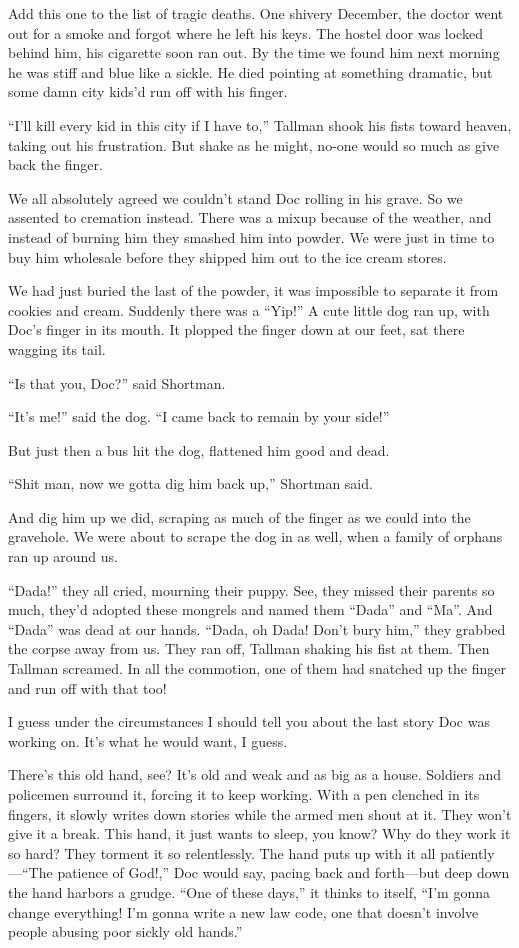\documentclass[oneside]{book}
\begin{document}
Add this one to the list of tragic deaths.
One shivery December, the doctor went out for a smoke and
forgot where he left his keys.  The hostel door was locked
behind him, his cigarette soon ran out.  By the time we
found him next morning he was stiff and blue like a sickle.
He died pointing at something dramatic, but some
damn city kids'd run off with his finger.

``I'll kill every kid in this city if I have to,''
Tallman shook his fists toward heaven, taking out his
frustration.  But shake as he might, no-one would so
much as give back the finger.

We all absolutely agreed we couldn't stand
Doc rolling in his grave.  So we assented to cremation
instead.  There was a mixup because of the weather, and
instead of burning him they smashed him into powder.
We were just in time to buy him wholesale
before they shipped him out to the ice cream stores.

We had just buried the last of the powder, it was impossible
to separate it from cookies and cream.  Suddenly there was
a ``Yip!''  A cute little dog ran up, with Doc's finger in
its mouth.  It plopped the finger down at our feet, sat there
wagging its tail.

``Is that you, Doc?'' said Shortman.

``It's me!'' said the dog.  ``I came back to remain by your side!''

But just then a bus hit the dog, flattened him good and dead.

``Shit man, now we gotta dig him back up,''
Shortman said.

And dig him up we did, scraping as much of the
finger as we could into the gravehole.  We were about to scrape
the dog in as well, when a family of orphans ran up around us.

``Dada!'' they all cried, mourning their puppy.  See, they missed their
parents so much, they'd adopted these mongrels and named them
``Dada'' and ``Ma''.  And ``Dada'' was dead at our hands.
``Dada, oh Dada!  Don't bury him,'' they grabbed the corpse away from
us.  They ran off, Tallman shaking his fist at them.  Then
Tallman screamed.  In all the commotion, one of them had
snatched up the finger and run off with that too!

I guess under the circumstances I should tell you about the last
story Doc was working on.  It's what he would want, I guess.

There's this old hand, see?  It's old and weak and as big as a house.
Soldiers and policemen surround it, forcing it to keep working.
With a pen clenched in its fingers, it slowly writes down stories
while the armed men shout at it.  They won't give it a break.
This hand, it just wants to sleep, you know?  Why do they work it so
hard?  They torment it so relentlessly.  The hand puts up with it all
patiently---``The patience of God!,'' Doc would say, pacing back and
forth---but deep down the hand harbors a grudge.
``One of these days,'' it thinks to itself, ``I'm gonna change
everything!  I'm gonna write a new law code, one that doesn't involve
people abusing poor sickly old hands.''
\end{document}
